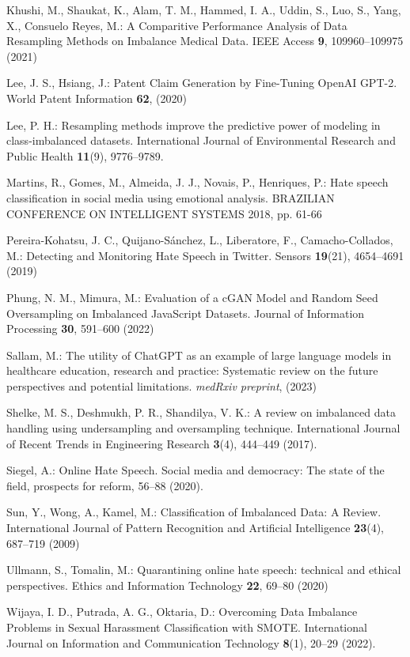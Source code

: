 \documentclass[runningheads]{llncs}
\begin{document}
\begin{thebibliography}{24}
Khushi, M., Shaukat, K., Alam, T. M., Hammed, I. A., Uddin, S., Luo, S., Yang, X., Consuelo Reyes, M.: A Comparitive Performance Analysis of Data Resampling Methods on Imbalance Medical Data. IEEE Access \textbf{9}, 109960--109975 (2021)

Lee, J. S., Hsiang, J.: Patent Claim Generation by Fine-Tuning OpenAI GPT-2. World Patent Information \textbf{62}, (2020)

Lee, P. H.: Resampling methods improve the predictive power of modeling in class-imbalanced datasets. International Journal of Environmental Research and Public Health \textbf{11}(9), 9776--9789.

Martins, R., Gomes, M., Almeida, J. J., Novais, P., Henriques, P.: Hate speech classification in social media using emotional analysis. BRAZILIAN CONFERENCE ON INTELLIGENT SYSTEMS 2018, pp. 61-66

Pereira-Kohatsu, J. C., Quijano-Sánchez, L., Liberatore, F., Camacho-Collados, M.: Detecting and Monitoring Hate Speech in Twitter. Sensors \textbf{19}(21), 4654--4691 (2019)

Phung, N. M., Mimura, M.: Evaluation of a cGAN Model and Random Seed Oversampling on Imbalanced JavaScript Datasets. Journal of Information Processing \textbf{30}, 591--600 (2022)

Sallam, M.: The utility of ChatGPT as an example of large language models in healthcare education, research and practice: Systematic review on the future perspectives and potential limitations. \emph{medRxiv preprint}, (2023)

Shelke, M. S., Deshmukh, P. R., Shandilya, V. K.: A review on imbalanced data handling using undersampling and oversampling technique. International Journal of Recent Trends in Engineering Research \textbf{3}(4), 444--449 (2017).

Siegel, A.: Online Hate Speech. Social media and democracy: The state of the field, prospects for reform, 56--88 (2020).

Sun, Y., Wong, A., Kamel, M.: Classification of Imbalanced Data: A Review. International Journal of Pattern Recognition and Artificial Intelligence \textbf{23}(4), 687--719 (2009)

Ullmann, S., Tomalin, M.: Quarantining online hate speech: technical and ethical perspectives. Ethics and Information Technology \textbf{22}, 69--80 (2020)

Wijaya, I. D., Putrada, A. G., Oktaria, D.: Overcoming Data Imbalance Problems in Sexual Harassment Classification with SMOTE. International Journal on Information and Communication Technology \textbf{8}(1), 20--29 (2022).

\end{thebibliography}
\end{document}
